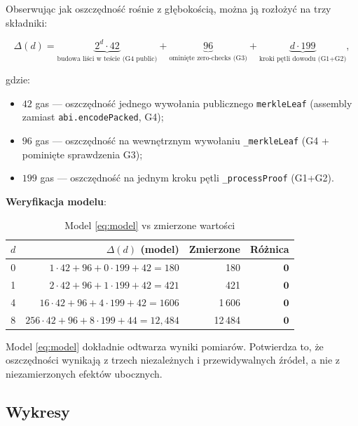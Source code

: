 \documentclass[11pt,a4paper]{article}
\begin{document}
Obserwując jak oszczędność rośnie z głębokością, można ją rozłożyć na trzy składniki:

\begin{equation}
\Delta(d) =
  \underbrace{2^d \cdot 42}_{\text{budowa liści w teście (G4 public)}}
  + \underbrace{96}_{\text{ominięte zero-checks (G3)}}
  + \underbrace{d \cdot 199}_{\text{kroki pętli dowodu (G1+G2)}},
  \label{eq:model}
\end{equation}

gdzie:
\begin{itemize}
  \item $42$ gas --- oszczędność jednego wywołania publicznego \texttt{merkleLeaf}
        (assembly zamiast \texttt{abi.encodePacked}, G4);
  \item $96$ gas --- oszczędność na wewnętrznym wywołaniu \texttt{\_merkleLeaf}
        (G4 + pominięte sprawdzenia G3);
  \item $199$ gas --- oszczędność na jednym kroku pętli \texttt{\_processProof} (G1+G2).
\end{itemize}

\noindent\textbf{Weryfikacja modelu}:

\begin{table}[H]
\centering
\caption{Model \eqref{eq:model} vs zmierzone wartości}
\begin{tabular}{crrr}
\toprule
\(d\) & $\Delta(d)$ (model) & Zmierzone & Różnica \\
\midrule
0 & $1\cdot42 + 96 + 0\cdot199 + 42 = 180$   & 180    & $\mathbf{0}$ \\
1 & $2\cdot42 + 96 + 1\cdot199 + 42 = 421$   & 421    & $\mathbf{0}$ \\
4 & $16\cdot42 + 96 + 4\cdot199 + 42 = 1606$ & 1\,606 & $\mathbf{0}$ \\
8 & $256\cdot42 + 96 + 8\cdot199 + 44 = 12{,}484$ & 12\,484 & $\mathbf{0}$ \\
\bottomrule
\end{tabular}
\end{table}

\noindent Model \eqref{eq:model} dokładnie odtwarza wyniki pomiarów.
Potwierdza to, że oszczędności wynikają z trzech niezależnych i przewidywalnych źródeł,
a nie z niezamierzonych efektów ubocznych.

\subsection{Wykresy}
\end{document}
